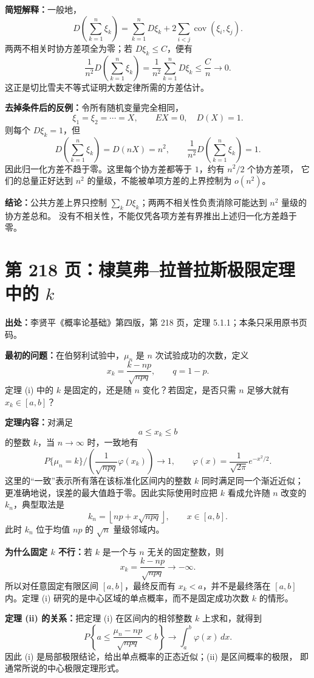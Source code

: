 \documentclass[UTF8,a4paper,11pt]{ctexart}
\begin{document}
\textbf{简短解释：}一般地，
\[
D\left(\sum_{k=1}^n\xi_k\right)
=\sum_{k=1}^nD\xi_k
 +2\sum_{i<j}\operatorname{cov}(\xi_i,\xi_j).
\]
两两不相关时协方差项全为零；若 $D\xi_k\le C$，便有
\[
\frac1{n^2}D\left(\sum_{k=1}^n\xi_k\right)
=\frac1{n^2}\sum_{k=1}^nD\xi_k
\le\frac Cn\longrightarrow0.
\]
这正是切比雪夫不等式证明大数定律所需的方差估计。

\textbf{去掉条件后的反例：}令所有随机变量完全相同，
\[
\xi_1=\xi_2=\cdots=X,\qquad EX=0,\quad D(X)=1.
\]
则每个 $D\xi_k=1$，但
\[
D\left(\sum_{k=1}^n\xi_k\right)=D(nX)=n^2,
\qquad
\frac1{n^2}D\left(\sum_{k=1}^n\xi_k\right)=1.
\]
因此归一化方差不趋于零。这里每个协方差都等于 $1$，约有 $n^2/2$ 个协方差项，
它们的总量正好达到 $n^2$ 的量级，不能被单项方差的上界控制为 $o(n^2)$。

\textbf{结论：}公共方差上界只控制
$\sum_kD\xi_k$；两两不相关性负责消除可能达到 $n^2$ 量级的协方差总和。
没有不相关性，不能仅凭各项方差有界推出上述归一化方差趋于零。

\newpage
\section{第 218 页：棣莫弗--拉普拉斯极限定理中的 $k$}
\label{note:probability-p218-demolaplace-local-limit}
\textbf{出处：}李贤平《概率论基础》第四版，第 218 页，定理 5.1.1；本条只采用原书页码。

\textbf{最初的问题：}在伯努利试验中，$\mu_n$ 是 $n$ 次试验成功的次数，定义
\[
x_k=\frac{k-np}{\sqrt{npq}},\qquad q=1-p.
\]
定理 (i) 中的 $k$ 是固定的，还是随 $n$ 变化？若固定，是否只需 $n$ 足够大就有
$x_k\in[a,b]$？

\textbf{定理内容：}对满足
\[
a\le x_k\le b
\]
的整数 $k$，当 $n\to\infty$ 时，一致地有
\[
P\{\mu_n=k\}\mathbin{\bigg/}
\left(\frac1{\sqrt{npq}}\varphi(x_k)\right)\longrightarrow1,
\qquad
\varphi(x)=\frac1{\sqrt{2\pi}}e^{-x^2/2}.
\]
这里的“一致”表示所有落在该标准化区间内的整数 $k$ 同时满足同一个渐近近似；
更准确地说，误差的最大值趋于零。因此实际使用时应把 $k$ 看成允许随 $n$ 改变的
$k_n$，典型取法是
\[
k_n=\left\lfloor np+x\sqrt{npq}\right\rfloor,\qquad x\in[a,b].
\]
此时 $k_n$ 位于均值 $np$ 的 $\sqrt n$ 量级邻域内。

\textbf{为什么固定 $k$ 不行：}若 $k$ 是一个与 $n$ 无关的固定整数，则
\[
x_k=\frac{k-np}{\sqrt{npq}}\longrightarrow-\infty.
\]
所以对任意固定有限区间 $[a,b]$，最终反而有 $x_k<a$，并不是最终落在
$[a,b]$ 内。定理 (i) 研究的是中心区域的单点概率，而不是固定成功次数 $k$ 的情形。

\textbf{定理 (ii) 的关系：}把定理 (i) 在区间内的相邻整数 $k$ 上求和，就得到
\[
P\left\{a\le\frac{\mu_n-np}{\sqrt{npq}}<b\right\}
\longrightarrow\int_a^b\varphi(x)\,dx.
\]
因此 (i) 是局部极限结论，给出单点概率的正态近似；(ii) 是区间概率的极限，
即通常所说的中心极限定理形式。
\end{document}
